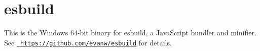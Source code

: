 \chapter{esbuild}
\hypertarget{md__c_1_2_users_2alexs_2source_2repos_2_s_q_8_term_project_8my_weather_2_s_q_8_term_project_8my_646f3306386d47d5c05ee5c66b6883dd}{}\label{md__c_1_2_users_2alexs_2source_2repos_2_s_q_8_term_project_8my_weather_2_s_q_8_term_project_8my_646f3306386d47d5c05ee5c66b6883dd}
\label{md__c_1_2_users_2alexs_2source_2repos_2_s_q_8_term_project_8my_weather_2_s_q_8_term_project_8my_646f3306386d47d5c05ee5c66b6883dd_autotoc_md134}%
%
 This is the Windows 64-\/bit binary for esbuild, a Java\+Script bundler and minifier. See \href{https://github.com/evanw/esbuild}{\texttt{ https\+://github.\+com/evanw/esbuild}} for details. 